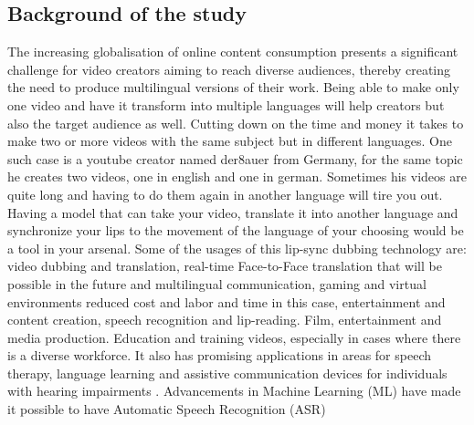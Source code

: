 \documentclass[12pt]{article}
\begin{document}
\subsection{Background of the study}
The increasing globalisation of online content consumption presents a significant challenge for video creators aiming to reach diverse audiences, thereby creating the need to produce multilingual versions of their work. Being able to make only one video and have it transform into multiple languages will help creators but also the target audience as well. Cutting down on the time and money it takes to make two or more videos with the same subject but in different languages. One such case is a youtube creator named der8auer from Germany, for the same topic he creates two videos, one in english and one in german. Sometimes his videos are quite long and having to do them again in another language will tire you out. Having a model that can take your video, translate it into another language and synchronize your lips to the movement of the language of your choosing would be a tool in your arsenal. Some of the usages of this lip-sync dubbing technology are: video dubbing and translation, real-time Face-to-Face translation that will be possible in the future and multilingual communication, gaming and virtual environments reduced cost and labor and time in this case, entertainment and content creation, speech recognition and lip-reading. Film, entertainment and media production. Education and training videos, especially in cases where there is a diverse workforce. It also has promising applications in areas for speech therapy, language learning and assistive communication devices for individuals with hearing impairments \cite{biomedinformatics4010023}. Advancements in Machine Learning (ML) have made it possible to have Automatic Speech Recognition (ASR) 
\end{document}
